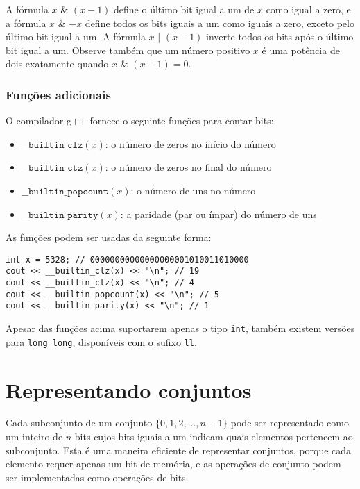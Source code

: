 A fórmula $x$ \& $(x-1)$ define o último
bit igual a um de $x$ como igual a zero,
e a fórmula $x$ \& $-x$ define todos os
bits iguais a um como iguais a zero, exceto pelo último bit igual a um.
A fórmula $x$ | $(x-1)$
inverte todos os bits após o último bit igual a um.
Observe também que um número positivo $x$ é
uma potência de dois exatamente quando $x$ \& $(x-1) = 0$.

\subsubsection*{Funções adicionais}

O compilador g++ fornece o seguinte
funções para contar bits:

\begin{itemize}
\item
$\texttt{\_\_builtin\_clz}(x)$:
o número de zeros no início do número
\item
$\texttt{\_\_builtin\_ctz}(x)$:
o número de zeros no final do número
\item
$\texttt{\_\_builtin\_popcount}(x)$:
o número de uns no número
\item
$\texttt{\_\_builtin\_parity}(x)$:
a paridade (par ou ímpar) do número de uns
\end{itemize}
\begin{samepage}

As funções podem ser usadas da seguinte forma:
\begin{lstlisting}
int x = 5328; // 00000000000000000001010011010000
cout << __builtin_clz(x) << "\n"; // 19
cout << __builtin_ctz(x) << "\n"; // 4
cout << __builtin_popcount(x) << "\n"; // 5
cout << __builtin_parity(x) << "\n"; // 1
\end{lstlisting}
\end{samepage}

Apesar das funções acima suportarem apenas o tipo \texttt{int},
também existem versões para \texttt{long long},
disponíveis com o sufixo \texttt{ll}.

\section{Representando conjuntos}

Cada subconjunto de um conjunto
$\{0,1,2,\ldots,n-1\}$
pode ser representado como um inteiro de $n$ bits
cujos bits iguais a um indicam quais
elementos pertencem ao subconjunto.
Esta é uma maneira eficiente de representar conjuntos,
porque cada elemento requer apenas um bit de memória,
e as operações de conjunto podem ser implementadas como operações de bits.

